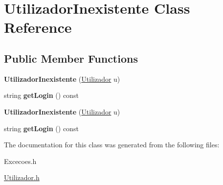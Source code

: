 \hypertarget{class_utilizador_inexistente}{}\section{Utilizador\+Inexistente Class Reference}
\label{class_utilizador_inexistente}
\subsection*{Public Member Functions}
\begin{DoxyCompactItemize}
\item 
\hypertarget{class_utilizador_inexistente_a1318284186c37111bf147dfb88ed143d}{}{\bfseries Utilizador\+Inexistente} (\hyperlink{class_utilizador}{Utilizador} u)\label{class_utilizador_inexistente_a1318284186c37111bf147dfb88ed143d}

\item 
\hypertarget{class_utilizador_inexistente_aa43e8ef928916c8ae7f7c80a25c1e435}{}string {\bfseries get\+Login} () const \label{class_utilizador_inexistente_aa43e8ef928916c8ae7f7c80a25c1e435}

\item 
\hypertarget{class_utilizador_inexistente_a1318284186c37111bf147dfb88ed143d}{}{\bfseries Utilizador\+Inexistente} (\hyperlink{class_utilizador}{Utilizador} u)\label{class_utilizador_inexistente_a1318284186c37111bf147dfb88ed143d}

\item 
\hypertarget{class_utilizador_inexistente_aa43e8ef928916c8ae7f7c80a25c1e435}{}string {\bfseries get\+Login} () const \label{class_utilizador_inexistente_aa43e8ef928916c8ae7f7c80a25c1e435}

\end{DoxyCompactItemize}


The documentation for this class was generated from the following files\+:\begin{DoxyCompactItemize}
\item 
Excecoes.\+h\item 
\hyperlink{_utilizador_8h}{Utilizador.\+h}\end{DoxyCompactItemize}
